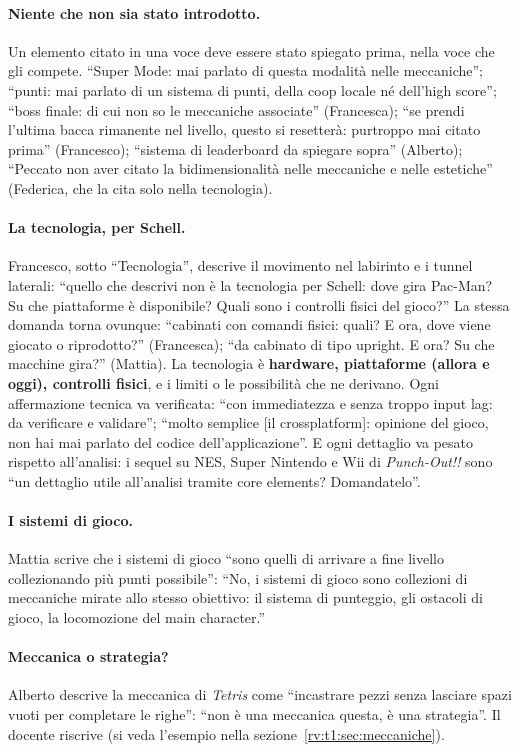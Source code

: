 \paragraph{Niente che non sia stato introdotto.} Un elemento citato in una
voce deve essere stato spiegato prima, nella voce che gli compete. ``Super
Mode: mai parlato di questa modalità nelle meccaniche''; ``punti: mai parlato
di un sistema di punti, della coop locale né dell'high score''; ``boss
finale: di cui non so le meccaniche associate'' (Francesca); ``se prendi
l'ultima bacca rimanente nel livello, questo si resetterà: purtroppo mai
citato prima'' (Francesco); ``sistema di leaderboard da spiegare sopra''
(Alberto); ``Peccato non aver citato la bidimensionalità nelle meccaniche e
nelle estetiche'' (Federica, che la cita solo nella tecnologia).

\paragraph{La tecnologia, per Schell.} Francesco, sotto ``Tecnologia'',
descrive il movimento nel labirinto e i tunnel laterali: ``quello che descrivi
non è la tecnologia per Schell: dove gira Pac-Man? Su che piattaforme è
disponibile? Quali sono i controlli fisici del gioco?'' La stessa domanda
torna ovunque: ``cabinati con comandi fisici: quali? E ora, dove viene giocato
o riprodotto?'' (Francesca); ``da cabinato di tipo upright. E ora? Su che
macchine gira?'' (Mattia). La tecnologia è \textbf{hardware, piattaforme
(allora e oggi), controlli fisici}, e i limiti o le possibilità che ne
derivano. Ogni affermazione tecnica va verificata: ``con immediatezza e senza
troppo input lag: da verificare e validare''; ``molto semplice [il
crossplatform]: opinione del gioco, non hai mai parlato del codice
dell'applicazione''. E ogni dettaglio va pesato rispetto all'analisi: i sequel
su NES, Super Nintendo e Wii di \emph{Punch-Out!!} sono ``un dettaglio utile
all'analisi tramite core elements? Domandatelo''.

\paragraph{I sistemi di gioco.} Mattia scrive che i sistemi di gioco
``sono quelli di arrivare a fine livello collezionando più punti possibile'':
``No, i sistemi di gioco sono collezioni di meccaniche mirate allo stesso
obiettivo: il sistema di punteggio, gli ostacoli di gioco, la locomozione del
main character.''

\paragraph{Meccanica o strategia?} Alberto descrive la meccanica di
\emph{Tetris} come ``incastrare pezzi senza lasciare spazi vuoti per
completare le righe'': ``non è una meccanica questa, è una strategia''. Il
docente riscrive (si veda l'esempio nella
sezione~\ref{rv:t1:sec:meccaniche}).

